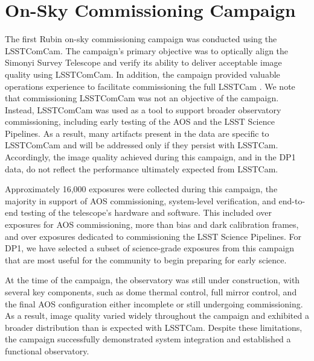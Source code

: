 \section{On-Sky Commissioning Campaign}
\label{sec:on_sky_campaign}

The first Rubin on-sky commissioning campaign was conducted using the \gls{LSSTComCam}. The campaign's primary objective was to optically align the Simonyi Survey Telescope and verify its ability to deliver acceptable image quality using \gls{LSSTComCam}.
In addition, the campaign provided valuable operations experience to facilitate commissioning the full \gls{LSSTCam} \citep{2024SPIE13096E..1OL,2024SPIE13096E..1SR}.
We note that commissioning \gls{LSSTComCam} was not an objective of the campaign.
Instead, LSSTComCam was used as a tool to support broader observatory commissioning, including early testing of the \gls{AOS} and the LSST Science Pipelines.
As a result, many artifacts present in the data are specific to \gls{LSSTComCam} and will be addressed only if they persist with \gls{LSSTCam}.
Accordingly, the image quality achieved during this campaign, and in the \gls{DP1} data, do not reflect the performance ultimately expected from \gls{LSSTCam}.

Approximately 16,000 exposures were collected during this campaign, the majority in support of \gls{AOS} commissioning, system-level verification, and end-to-end testing of the telescope’s hardware and software.
This included over \nexposuresaoscommissioning exposures for \gls{AOS} commissioning, more than \nexposurescalibcommissioning bias and dark calibration frames, and over \nexposuresspcommissioning exposures dedicated to commissioning the LSST Science Pipelines.
For \gls{DP1}, we have selected a subset of \nexposures science-grade exposures from this campaign that are most useful for the community to begin preparing for early science.

At the time of the campaign, the observatory was still under construction, with several key components, such as dome thermal control, full mirror control, and the final \gls{AOS} configuration either incomplete or still undergoing commissioning.
As a result, image quality varied widely throughout the campaign and exhibited a broader distribution than is expected with \gls{LSSTCam}.
Despite these limitations, the campaign successfully demonstrated system integration and established a functional observatory.

